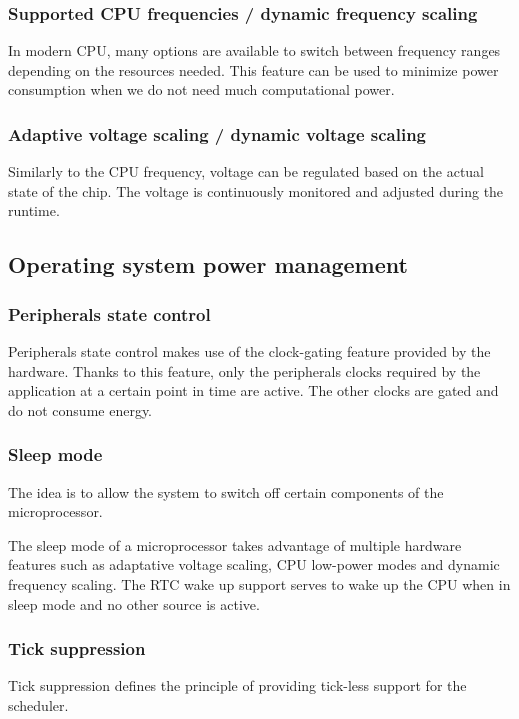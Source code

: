 \subsubsection{Supported CPU frequencies / dynamic frequency scaling}
In modern CPU, many options are available to switch between frequency ranges depending on the resources needed.
This feature can be used to minimize power consumption when  we do not need much computational power.

\subsubsection{Adaptive voltage scaling / dynamic voltage scaling}
Similarly to the CPU frequency, voltage can be regulated based on the actual state of the chip.
The voltage is continuously monitored and adjusted during the runtime.


\subsection{Operating system power management}

\subsubsection{Peripherals state control}
Peripherals state control makes use of the clock-gating feature provided by the hardware.
Thanks to this feature, only the peripherals clocks required by the application at a certain point in time are active.
The other clocks are gated and do not consume energy.

\subsubsection{Sleep mode}
The idea is to allow the system to switch off certain components of the mi\-cro\-pro\-ces\-sor.

The sleep mode of a microprocessor takes advantage of multiple hardware features
    such as adaptative voltage scaling, CPU low-power modes and dynamic frequency scaling.
The RTC wake up support serves to wake up the CPU when in sleep mode and no other source is active.

\subsubsection{Tick suppression}
Tick suppression defines the principle of providing tick-less support for the scheduler.

